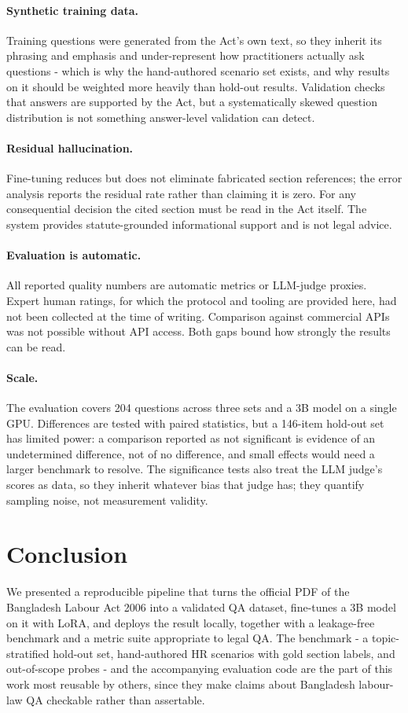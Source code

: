 \documentclass[11pt,a4paper]{article}
\begin{document}
\paragraph{Synthetic training data.} Training questions were generated from the Act's own text, so they inherit its phrasing and emphasis and under-represent how practitioners actually ask questions - which is why the hand-authored scenario set exists, and why results on it should be weighted more heavily than hold-out results. Validation checks that answers are supported by the Act, but a systematically skewed question distribution is not something answer-level validation can detect.

\paragraph{Residual hallucination.} Fine-tuning reduces but does not eliminate fabricated section references; the error analysis reports the residual rate rather than claiming it is zero. For any consequential decision the cited section must be read in the Act itself. The system provides statute-grounded informational support and is not legal advice.

\paragraph{Evaluation is automatic.} All reported quality numbers are automatic metrics or LLM-judge proxies. Expert human ratings, for which the protocol and tooling are provided here, had not been collected at the time of writing. Comparison against commercial APIs was not possible without API access. Both gaps bound how strongly the results can be read.

\paragraph{Scale.} The evaluation covers 204 questions across three sets and a 3B model on a single GPU. Differences are tested with paired statistics, but a 146-item hold-out set has limited power: a comparison reported as not significant is evidence of an undetermined difference, not of no difference, and small effects would need a larger benchmark to resolve. The significance tests also treat the LLM judge's scores as data, so they inherit whatever bias that judge has; they quantify sampling noise, not measurement validity.
\section{Conclusion}
We presented a reproducible pipeline that turns the official PDF of the Bangladesh Labour Act 2006 into a validated QA dataset, fine-tunes a 3B model on it with LoRA, and deploys the result locally, together with a leakage-free benchmark and a metric suite appropriate to legal QA. The benchmark - a topic-stratified hold-out set, hand-authored HR scenarios with gold section labels, and out-of-scope probes - and the accompanying evaluation code are the part of this work most reusable by others, since they make claims about Bangladesh labour-law QA checkable rather than assertable.
\end{document}
